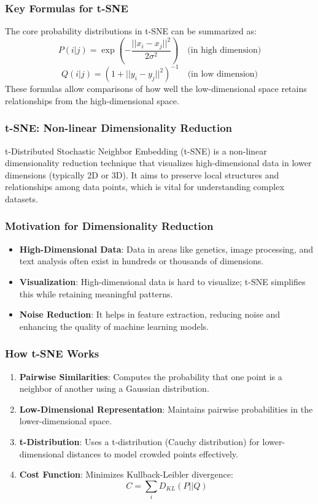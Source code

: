 \documentclass[aspectratio=169]{beamer}
\begin{document}
\begin{frame}[fragile]
    \frametitle{Key Formulas for t-SNE}
    The core probability distributions in t-SNE can be summarized as:
    \begin{equation}
        P(i|j) = \exp\left(-\frac{||x_i - x_j||^2}{2\sigma^2}\right) \quad \text{(in high dimension)}
    \end{equation}
    \begin{equation}
        Q(i|j) = (1 + ||y_i - y_j||^2)^{-1} \quad \text{(in low dimension)}
    \end{equation}
    These formulas allow comparisons of how well the low-dimensional space retains relationships from the high-dimensional space.
\end{frame}

\begin{frame}[fragile]
    \frametitle{t-SNE: Non-linear Dimensionality Reduction}
    t-Distributed Stochastic Neighbor Embedding (t-SNE) is a non-linear dimensionality reduction technique that visualizes high-dimensional data in lower dimensions (typically 2D or 3D). It aims to preserve local structures and relationships among data points, which is vital for understanding complex datasets.
\end{frame}

\begin{frame}[fragile]
    \frametitle{Motivation for Dimensionality Reduction}
    \begin{itemize}
        \item \textbf{High-Dimensional Data}: Data in areas like genetics, image processing, and text analysis often exist in hundreds or thousands of dimensions.
        \item \textbf{Visualization}: High-dimensional data is hard to visualize; t-SNE simplifies this while retaining meaningful patterns.
        \item \textbf{Noise Reduction}: It helps in feature extraction, reducing noise and enhancing the quality of machine learning models.
    \end{itemize}
\end{frame}

\begin{frame}[fragile]
    \frametitle{How t-SNE Works}
    \begin{enumerate}
        \item \textbf{Pairwise Similarities}: Computes the probability that one point is a neighbor of another using a Gaussian distribution.
        \item \textbf{Low-Dimensional Representation}: Maintains pairwise probabilities in the lower-dimensional space.
        \item \textbf{t-Distribution}: Uses a t-distribution (Cauchy distribution) for lower-dimensional distances to model crowded points effectively.
        \item \textbf{Cost Function}: Minimizes Kullback-Leibler divergence:
        \begin{equation}
        C = \sum_{i} D_{KL}(P || Q)
        \end{equation}
    \end{enumerate}
\end{frame}
\end{document}
